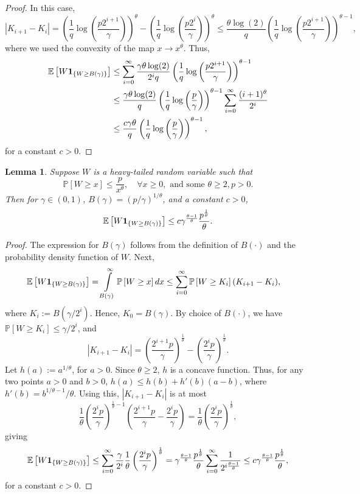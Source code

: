 \documentclass{article}
\newcommand{\lrp}[1]{\left( #1 \right)}
\newcommand{\lrs}[1]{\left[ #1 \right]}
\newcommand{\abs}[1]{\left|{#1}\right|}
\newcommand{\E}[1]{\mathbb{E}\lrs{#1}}
\newcommand{\Prob}[1]{\mathbb{P}\lrs{#1}}
\newtheorem{lemma}[theorem]{Lemma}
\begin{document}
\begin{proof}
 In this case,
    \[\abs{K_{i+1} - K_i} = \lrp{\frac{1}{q}\log\left(\frac{p 2^{i+1}}{\gamma}\right)}^\theta - \lrp{\frac{1}{q}\log\left(\frac{p 2^{i}}{\gamma}\right)}^\theta \le \frac{\theta \log(2)}{q}\lrp{\frac{1}{q}\log\left(\frac{p 2^{i+1}}{\gamma}\right)}^{\theta-1},\]
    where we used the convexity of the map $x \rightarrow x^\theta$.
    Thus, 
    \begin{align*} 
    \E{ W{\bf 1}_{\{W \ge B(\gamma)\}} } &\le \sum\limits_{i=0}^\infty \frac{\gamma \theta \log(2)}{2^i q}\lrp{\frac{1}{q}\log\left(\frac{p 2^{i+1}}{\gamma}\right)}^{\theta-1} \\
    &\le \frac{\gamma\theta\log(2)}{q}\lrp{\frac{1}{q}\log\left(\frac{p}{\gamma}\right)}^{\theta-1}  \sum\limits_{i=0}^\infty \frac{(i+1)^\theta}{2^i}\\
    &\le  \frac{c \gamma \theta}{q}\lrp{\frac{1}{q}\log\left(\frac{p}{\gamma}\right)}^{\theta-1},
    \end{align*}
    for a constant $c > 0$. 
\end{proof}

\begin{lemma}\label{lem:subpareto}
Suppose $W$ is a heavy-tailed random variable such that 
\[ \Prob{W \ge x} \le \frac{p}{x^\theta}, \quad \forall x\ge 0, \text{ and  some }\theta \ge 2, p> 0. \]
Then for $\gamma \in (0,1)$,  $B(\gamma) = \lrp{ p/\gamma }^{1/\theta}$, and a constant $c > 0$, 
\[ \E{ W{\bf 1}_{\{W \ge B(\gamma)\}} } \le c\gamma^\frac{\theta - 1}{\theta}\frac{p^\frac{1}{\theta}}{\theta}. \]
\end{lemma}
\begin{proof}
The expression for $B(\gamma)$ follows from the definition of $B(\cdot)$ and the probability density function of $W$. Next,
\begin{align*}
    \E{ W{\bf 1}_{\{W \ge B(\gamma)\}} } 
    &= \int\limits_{B(\gamma)}^\infty \Prob{ W \ge x } dx \le  \sum\limits_{i=0}^\infty \Prob{W \ge K_i} (K_{i+1}  - K_i),
\end{align*}    
where $K_i := B(\gamma/2^i)$. Hence, $K_0 = B(\gamma)$. By choice of $B(\cdot)$, we have $\Prob{W \ge K_i} \le \gamma/2^i$, and 
\[\abs{K_{i+1} - K_i} = \lrp{ \frac{2^{i+1}p}{\gamma} }^\frac{1}{\theta} - \lrp{\frac{2^{i}p}{\gamma}}^\frac{1}{\theta}.\]
Let $h(a) := a^{1/\theta}$, for $a > 0$. Since $\theta \ge 2$, $h$ is a concave function. Thus, for any two points $a > 0$ and $b > 0$, $h(a) \le h(b) + h'(b)(a-b)$, where $h'(b) = b^{1/\theta - 1}/\theta$. Using this, $\abs{K_{i+1} - K_i}$ is at most 
\[  \frac{1}{\theta} \lrp{ \frac{2^{i}p}{\gamma} }^{\frac{1}{\theta} - 1}\lrp{  \frac{2^{i+1}p}{\gamma} -  \frac{2^{i}p}{\gamma} } = \frac{1}{\theta} \lrp{ \frac{2^{i}p}{\gamma} }^{\frac{1}{\theta} }, \]
giving 
\[ \E{ W{\bf 1}_{\{W \ge B(\gamma)\}} } \le \sum\limits_{i=0}^\infty \frac{\gamma}{2^i} \frac{1}{\theta} \lrp{ \frac{2^{i}p}{\gamma} }^{\frac{1}{\theta} } = \gamma^\frac{\theta - 1}{\theta}\frac{p^\frac{1}{\theta}}{\theta} \sum\limits_{i=0}^\infty \frac{1}{2^{i \frac{\theta - 1}{\theta}}} \le c\gamma^\frac{\theta - 1}{\theta}\frac{p^\frac{1}{\theta}}{\theta}, \]
for a constant $c > 0$.
\end{proof}
\end{document}
